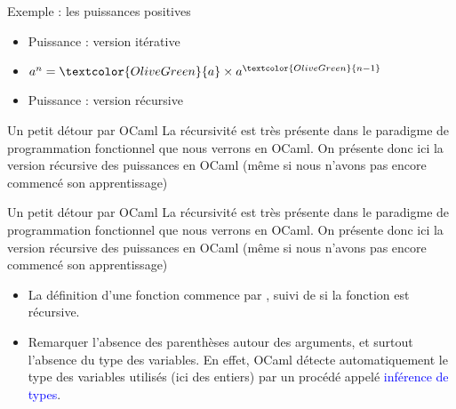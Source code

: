 \documentclass[10pt]{beamer}
\begin{document}
\begin{frame}[fragile]{\Ctitle}{\stitle}
	\begin{exampleblock}{Exemple : les puissances positives}
		\begin{itemize}
			\item<1-> \textcolor{OliveGreen}{Puissance : version itérative}
			\item<2-> $a^n = \textcolor{OliveGreen}{a} \times a^{\textcolor{OliveGreen}{n-1}}$
			\item<3-> \textcolor{OliveGreen}{Puissance : version récursive}
		\end{itemize}
	\end{exampleblock}
\end{frame}

\begin{frame}[fragile]{\Ctitle}{\stitle}
	\begin{block}{Un petit détour par OCaml}
		La récursivité est très présente dans le paradigme de programmation fonctionnel que nous verrons en OCaml.
		On présente donc ici la version récursive des puissances en OCaml (même si nous n'avons pas encore commencé son apprentissage)
		\onslide<2->
	\end{block}
\end{frame}

\begin{frame}[fragile]{\Ctitle}{\stitle}
	\begin{block}{Un petit détour par OCaml}
		La récursivité est très présente dans le paradigme de programmation fonctionnel que nous verrons en OCaml.
		On présente donc ici la version récursive des puissances en OCaml (même si nous n'avons pas encore commencé son apprentissage)
		\begin{itemize}
			\item <2-> La définition d'une fonction commence par , suivi de  si la fonction est récursive.
			\item <3-> Remarquer l'absence des parenthèses autour des arguments, et surtout l'absence du type des variables. En effet, OCaml détecte automatiquement le type des variables utilisés (ici des entiers) par un procédé appelé \textcolor{blue}{inférence de types}.
		\end{itemize}
	\end{block}
\end{frame}
\end{document}
